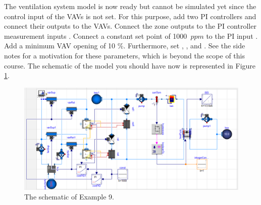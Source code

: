 \documentclass[10pt,a4paper]{article}
\begin{document}
The ventilation system model is now ready but cannot be simulated yet since
the control input of the VAVs is not set.
For this purpose, add two PI controllers and connect their outputs to the VAVs.
Connect the zone  outputs to the PI controller measurement inputs .
Connect a constant set point of 1000~$ppm$ to the PI input .
Add a minimum VAV opening of 10 \%.
Furthermore, set ,  ,  and . 
See the side notes for a motivation for these parameters, 
which is beyond the scope of this course. The schematic of the model you should have now is represented in Figure \ref{fig:ex9}.


\begin{figure}[h]
	\centering
	\includegraphics[width=\linewidth]{Schematic9.png}
	\caption{The schematic of Example 9.}
	\label{fig:ex9}
\end{figure}
\end{document}

